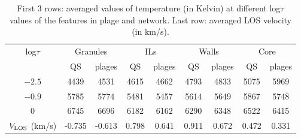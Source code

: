 \documentclass[goettingen, gauss, print]{thesis}
\begin{document}
\begin{itemize}


\end{itemize}
\begin{table}
\caption{First 3 rows: averaged values of temperature (in Kelvin) at different log$\tau$ values of the features in plage and network. Last row: averaged LOS velocity (in km/s). }
\label{tab:stat}
\centering

\begin{tabular}{ccccccccc}

\hline
\hline
log$\tau$ & \multicolumn{2}{c}{Granules} & \multicolumn{2}{c}{ILs}  &\multicolumn{2}{c}{Walls} & \multicolumn{2}{c}{Core}\\
  & QS & plages  & QS& plages& QS& plages & QS & plages\\
\hline
 $-2.5$& 4439 &4531&4615&4662&4793&4833&5075&5969 \\
 $-0.9$& 5785&5774&5481&5457&5614&5649&5867&5748\\
 $0$&6745&6696&6182&6162&6290&6348&6522&6415\\
 \hline
 \hline
 $V_{\rm LOS}$ (km/s) & -0.735&-0.613&0.798&0.641&0.911&0.672&0.472&0.331\\
 

\hline
\end{tabular}

\end{table}
\fi
\end{document}

